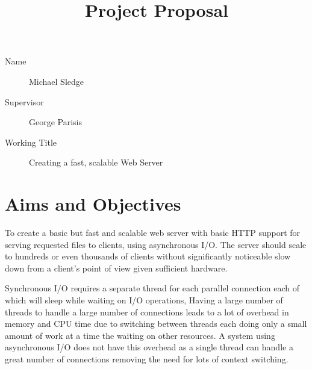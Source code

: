 \documentclass{article}
\begin{document}
\title{Project Proposal}
\maketitle
\begin{description}
	\item[Name] Michael Sledge
	\item[Supervisor] George Parisis
	\item[Working Title] Creating a fast, scalable Web Server
\end{description}
\section{Aims and Objectives}
\begin{comment}
Could you please update the proposal to include some more in the aims and objectives section? More specifically, we want to see what are your general aims and expected outcome from this project; i.e. why are you doing it and what do you expect to get out of it. Also, please write some more on the project objectives. Async I/O is very good but I am sure you can be a bit more specific about other aspects (e.g. scalability, response times). why async I/O is good compared to multi-threading etc..
\end{comment}

\begin{comment}
aims describe purpose and intention and include a description of your motivations for undertaking this particular topic. Objectives relate to the expected outcomes of the project. You should break these down into 'primary objectives' which you guarantee to achieve and 'extensions' which will only be implemented if time allows. The primary objectives should be clearly specified, but the extensions may be vaguer. Do not be afraid to specify more extensions than you will be able to implement.
\end{comment}

To create a basic but fast and scalable web server with basic HTTP support for serving requested files to clients, using asynchronous I/O. The server should scale to hundreds or even thousands of clients without significantly noticeable slow down from a client's point of view given sufficient hardware.

Synchronous I/O requires a separate thread for each parallel connection each of which will sleep while waiting on I/O operations, Having a large number of threads to handle a large number of connections leads to a lot of overhead in memory and CPU time due to switching between threads each doing only a small amount of work at a time the waiting on other resources. A system using asynchronous I/O does not have this overhead as a single thread can handle a great number of connections removing the need for lots of context switching.
\end{document}
